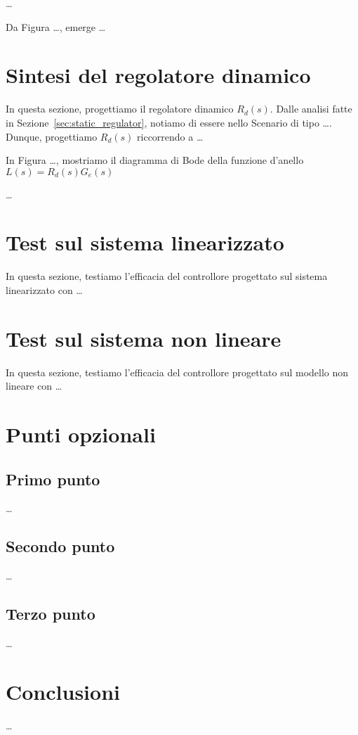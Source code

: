 \documentclass[a4paper, 11pt]{article}
\begin{document}
\dots

Da Figura \dots, emerge \dots


\section{Sintesi del regolatore dinamico}

In questa sezione, progettiamo il regolatore dinamico $R_d(s)$. 
%
Dalle analisi fatte in Sezione~\ref{sec:static_regulator}, notiamo di essere nello Scenario di tipo \dots. Dunque, progettiamo $R_d(s)$ riccorrendo a \dots


In Figura \dots, mostriamo il diagramma di Bode della funzione d'anello $L(s) = R_d(s) G_e(s)$

\dots

\section{Test sul sistema linearizzato}

In questa sezione, testiamo l'efficacia del controllore progettato sul sistema linearizzato con \dots

\section{Test sul sistema non lineare}

In questa sezione, testiamo l'efficacia del controllore progettato sul modello non lineare con \dots


\section{Punti opzionali}

\subsection{Primo punto}

\dots 

\subsection{Secondo punto}

\dots

\subsection{Terzo punto}

\dots

\section{Conclusioni}

\dots
\end{document}
